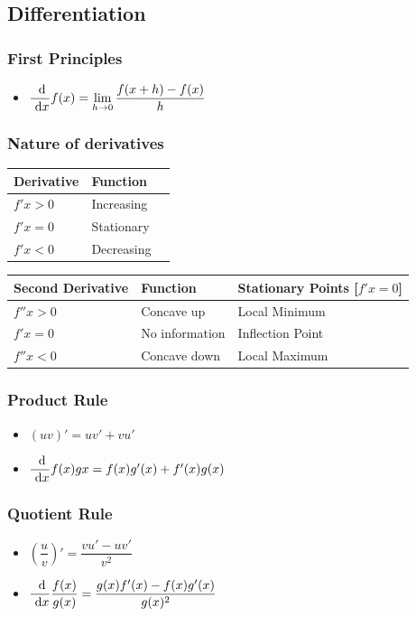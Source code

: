\documentclass[]{report}
\newcommand \tab[1][1cm]{\hspace*{#1}}
\newcommand{\dn}[1]{\ \mathrm{d}#1}
\newcommand{\dd}[2]{ \dfrac{\dn #1}{\dn #2}}
\newcommand{\itemt}{\item \tab}
\begin{document}
		\subsection{Differentiation}

\subsubsection{First Principles}

\begin{itemize}
\itemt \( \dd{}{x} f(x) = \lim\limits_{h\to0} \dfrac{f(x+h)-f(x)}{h} \)
\end{itemize}

\subsubsection{Nature of derivatives}

\def\arraystretch{1.5}

\begin{minipage}{.5\linewidth}
\begin{tabular}{ |l|l|l| } 
\hline
\textbf{Derivative}		& \textbf{Function}
\\ \hline
$f'x > 0$				& Increasing
\\ \hline
$f'x = 0$				& Stationary
\\ \hline
$f'x < 0$				& Decreasing
\\ \hline
\end{tabular}
\begin{tabular}{ |l|l|l| } 
\hline
\textbf{Second Derivative}		& \textbf{Function}	& \textbf{Stationary Points [$f'x=0$]}
\\ \hline
$f''x > 0$					& Concave up		& Local Minimum
\\ \hline
$f'x = 0$						& No information	& Inflection Point
\\ \hline
$f''x < 0$						& Concave down		& Local Maximum
\\ \hline
\end{tabular}
\end{minipage}

\subsubsection{Product Rule}
\begin{itemize}
\itemt \( (uv)' = uv' + vu' \)
\itemt \( \dd{}{x} f(x)gx = f(x)g'(x)+f'(x)g(x) \)
\end{itemize}

\subsubsection{Quotient Rule}
\begin{itemize}
\itemt \( (\dfrac{u}{v})' = \dfrac{vu'-uv'}{v^2} \)
\itemt \( \dd{}{x} \dfrac{f(x)}{g(x)} = \dfrac{g(x)f'(x)-f(x)g'(x)}{g(x)^2} \)
\end{itemize}
\end{document}
